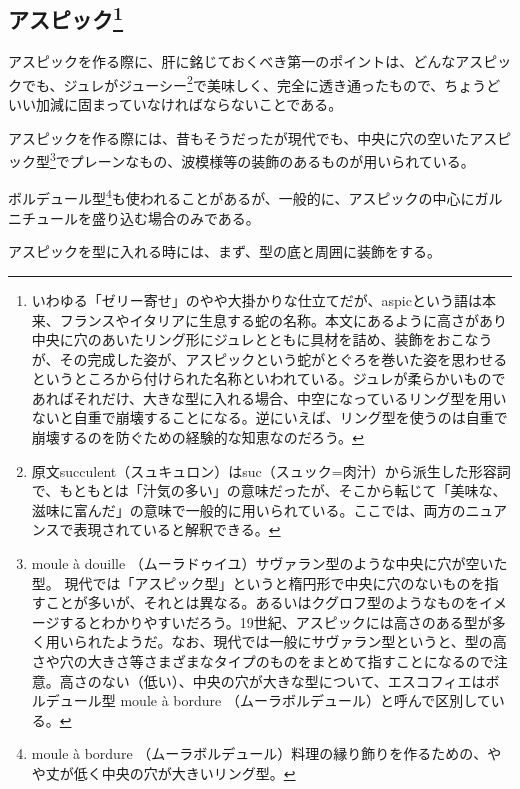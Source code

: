 \begin{Main}
\hypertarget{aspics}{%
\subsection[アスピック]{\texorpdfstring{アスピック\footnote{いわゆる「ゼリー寄せ」のやや大掛かりな仕立てだが、aspicという語は本来、フランスやイタリアに生息する蛇の名称。本文にあるように高さがあり中央に穴のあいたリング形にジュレとともに具材を詰め、装飾をおこなうが、その完成した姿が、アスピックという蛇がとぐろを巻いた姿を思わせるというところから付けられた名称といわれている。ジュレが柔らかいものであればそれだけ、大きな型に入れる場合、中空になっているリング型を用いないと自重で崩壊することになる。逆にいえば、リング型を使うのは自重で崩壊するのを防ぐための経験的な知恵なのだろう。}}{アスピック}}\label{aspics}}



アスピックを作る際に、肝に銘じておくべき第一のポイントは、どんなアスピックでも、ジュレがジューシー\footnote{原文succulent（スュキュロン）はsuc（スュック=肉汁）から派生した形容詞で、もともとは「汁気の多い」の意味だったが、そこから転じて「美味な、滋味に富んだ」の意味で一般的に用いられている。ここでは、両方のニュアンスで表現されていると解釈できる。}で美味しく、完全に透き通ったもので、ちょうどいい加減に固まっていなければならないことである。

アスピックを作る際には、昔もそうだったが現代でも、中央に穴の空いたアスピック型\footnote{moule
  à douille （ムーラドゥイユ）サヴァラン型のような中央に穴が空いた型。
  現代では「アスピック型」というと楕円形で中央に穴のないものを指すことが多いが、それとは異なる。あるいはクグロフ型のようなものをイメージするとわかりやすいだろう。19世紀、アスピックには高さのある型が多く用いられたようだ。なお、現代では一般にサヴァラン型というと、型の高さや穴の大きさ等さまざまなタイプのものをまとめて指すことになるので注意。高さのない（低い）、中央の穴が大きな型について、エスコフィエはボルデュール型
  moule à bordure （ムーラボルデュール）と呼んで区別している。}でプレーンなもの、波模様等の装飾のあるものが用いられている。

ボルデュール型\footnote{moule à bordure
  （ムーラボルデュール）料理の縁り飾りを作るための、やや丈が低く中央の穴が大きいリング型。}も使われることがあるが、一般的に、アスピックの中心にガルニチュールを盛り込む場合のみである。

アスピックを型に入れる時には、まず、型の底と周囲に装飾をする。


\end{Main}
